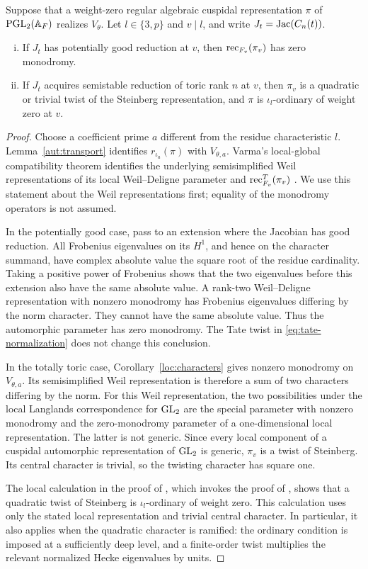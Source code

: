 \begin{lemma}\label{aut:automorphic-local}
Suppose that a weight-zero regular algebraic cuspidal representation
$\pi$ of $\operatorname{PGL}_2(\mathbb A_F)$ realizes $V_\theta$. Let $l\in\{3,p\}$ and
$v\mid l$, and write $J_t=\operatorname{Jac}(C_n(t))$.
\begin{enumerate}[(i)]
\item If $J_t$ has potentially good reduction at $v$, then
$\operatorname{rec}_{F_v}(\pi_v)$ has zero monodromy.
\item If $J_t$ acquires semistable reduction of toric rank $n$ at $v$,
then $\pi_v$ is a
quadratic or trivial twist of the Steinberg representation, and $\pi$ is
$\iota_l$-ordinary of weight zero at $v$.
\end{enumerate}
\end{lemma}
\begin{proof}
Choose a coefficient prime $a$ different from the residue characteristic
$l$. Lemma~\ref{aut:transport} identifies $r_{\iota_a}(\pi)$ with
$V_{\theta,a}$. Varma's local-global compatibility theorem identifies the
underlying semisimplified Weil representations of its local
Weil--Deligne parameter and $\operatorname{rec}^T_{F_v}(\pi_v)$
\cite[Theorem~1]{Varma}. We use this statement about the Weil
representations first; equality of the monodromy operators is not assumed.

In the potentially good case, pass to an extension where the Jacobian has
good reduction. All Frobenius eigenvalues on its $H^1$, and hence on the
character summand, have complex absolute value the square root of the
residue cardinality. Taking a positive power of Frobenius shows that the
two eigenvalues before this extension also have the same absolute value.
A rank-two Weil--Deligne representation with nonzero monodromy has
Frobenius eigenvalues differing by the norm character. They cannot have
the same absolute value. Thus the automorphic parameter has zero
monodromy. The Tate twist in \eqref{eq:tate-normalization} does not change
this conclusion.

In the totally toric case, Corollary~\ref{loc:characters} gives
nonzero monodromy on $V_{\theta,a}$. Its semisimplified Weil representation
is therefore a sum of two characters differing by the norm. For this
Weil representation, the two possibilities under the local Langlands
correspondence for $\operatorname{GL}_2$ are the special parameter with nonzero
monodromy and the zero-monodromy parameter of a one-dimensional local
representation. The latter is not generic. Since every local component
of a cuspidal automorphic representation of $\operatorname{GL}_2$ is generic, $\pi_v$
is a twist of Steinberg. Its central character is trivial, so the twisting
character has square one.

The local calculation in the proof of
\cite[Lemma~6.1.3(4)]{CN}, which invokes the proof of
\cite[Lemma~5.6]{Geraghty}, shows that a quadratic twist of Steinberg is
$\iota_l$-ordinary of weight zero. This calculation uses only the stated
local representation and trivial central character. In particular, it
also applies when the quadratic character is ramified: the ordinary
condition is imposed at a sufficiently deep level, and a finite-order
twist multiplies the relevant normalized Hecke eigenvalues by units.
\end{proof}

